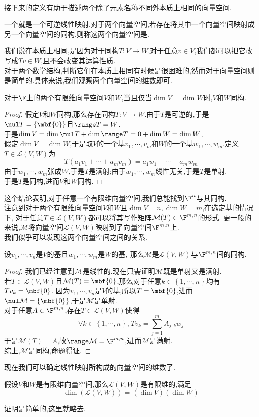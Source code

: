 \documentclass{ctexart}
\begin{document}
\\
接下来的定义有助于描述两个除了元素名称不同外本质上相同的向量空间.
\begin{definition}[2.1 定义:同构,同构的]
    一个就是一个可逆线性映射.对于两个向量空间,若存在将其中一个向量空间映射成另一个向量空间的同构,则称这两个向量空间是.
\end{definition}\noindent
我们说在本质上相同,是因为对于同构$T:V\to W$,对于任意$v\in V$,我们都可以把它改写成$Tv\in W$,且不会改变其运算性质.\\
对于两个数学结构,判断它们在本质上相同有时候是很困难的,然而对于向量空间则是简单的.具体来说,我们观察两个向量空间的维数即可.
\begin{formal}[2.2 维数表明向量空间是否同构]
    对于$\F$上的两个有限维向量空间$V$和$W$,当且仅当$\dim V=\dim W$时,$V$和$W$同构.
\end{formal}
\begin{proof}
    假定$V$和$W$同构,那么存在同构$T:V\to W$.由于$T$是可逆的,于是$\nul T=\left\{\mbf{0}\right\}$且$\range T=W$.\\
    于是$\dim V=\dim\nul T+\dim\range T=0+\dim W=\dim W$.\\
    假定$\dim V=\dim W$,于是取$V$的一个基$v_1,\cdots,v_m$和$W$的一个基$w_1,\cdots,w_m$.定义$T\in\mathcal{L}(V,W)$为
    $$T\left(a_1v_1+\cdots+a_mv_m\right)=a_1w_1+\cdots+a_mw_m$$
    由于$w_1,\cdots,w_m$张成$W$,于是$T$是满射;由于$w_1,\cdots,w_m$线性无关,于是$T$是单射.\\
    于是$T$是同构,进而$V$和$W$同构.
\end{proof}\noindent
这个结论表明,对于任意一个有限维向量空间,我们总能找到$\F^n$与其同构.\\
注意到对于两个有限维向量空间$V$和$W$且$\dim V=n,\dim W=m$,在选定基的情况下,
对于任意$T\in\mathcal{L}(V,W)$都可以将其写作矩阵$\mathcal{M}(T)\in\F^{m,n}$的形式.
更一般的来说,$\mathcal{M}$将向量空间$\mathcal{L}(V,W)$映射到了向量空间$\F^{m,n}$上.\\
我们似乎可以发现这两个向量空间之间的关系.
\begin{formal}[2.3 $\mathcal{L}(V,W)$与$\F^{m,n}$同构]
    设$v_1,\cdots,v_n$是$V$的基且$w_1,\cdots,w_m$是$W$的基,
    那么$\mathcal{M}$是$\mathcal{L}(V,W)$与$\F^{m,n}$间的同构.
\end{formal}
\begin{proof}
    我们已经注意到$\mathcal{M}$是线性的.现在只需证明$\mathcal{M}$既是单射又是满射.\\
    若$T\in\mathcal{L}(V,W)$且$\mathcal{M}(T)=\mbf{0}$,那么对于任意$k\in\left\{1,\cdots,n\right\}$均有$Tv_k=\mbf{0}$.
    因为$v_1,\cdots,v_n$是$V$的基,所以$T=\mbf{0}$,进而$\nul\mathcal{M}=\left\{\mbf{0}\right\}$,于是$\mathcal{M}$是单射.\\
    对于任意$A\in\F^{m,n}$,存在$T\in\mathcal{L}(V,W)$使得
    $$\forall k\in\left\{1,\cdots,n\right\},Tv_k=\sum_{j=1}^{m}A_{j,k}w_j$$
    于是$\mathcal{M}(T)=A$,故$\range\mathcal{M}=\F^{m,n}$,进而$\mathcal{M}$是满射.\\
    综上,$\mathcal{M}$是同构,命题得证.
\end{proof}\noindent
现在我们可以确定线性映射所构成的向量空间的维数了.
\begin{formal}[2.4 线性映射的向量空间的维数]
    假设$V$和$W$是有限维向量空间,那么$\mathcal{L}(V,W)$是有限维的,满足
    $$\dim\left(\mathcal{L}(V,W)\right)=\left(\dim V\right)\left(\dim W\right)$$
\end{formal}\noindent
证明是简单的,这里就略去.
\end{document}
